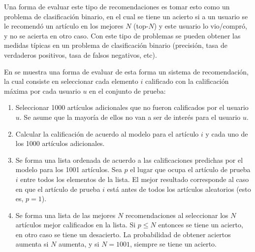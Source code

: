 Una forma de evaluar este tipo de recomendaciones es tomar esto como un problema de clasificación binario, en el cual se tiene un acierto si a un usuario se le recomendó un artículo en los mejores $N$ (top-$N$) y este usuario lo vio/compró, y no se acierta en otro caso. Con este tipo de problemas se pueden obtener las medidas típicas en un problema de clasificación binario (precisión, tasa de verdaderos positivos, tasa de falsos negativos, etc). 

En \cite{Cremonesi:2010:PRA:1864708.1864721} se muestra una forma de evaluar de esta forma un sistema de recomendación, la cual consiste en seleccionar cada elemento $i$ calificado con la calificación máxima por cada usuario $u$ en el conjunto de prueba:

\begin{enumerate}
  \item Seleccionar 1000 artículos adicionales que no fueron calificados por el usuario $u$. Se asume que la mayoría de ellos no van a ser de interés para el usuario $u$.
  \item Calcular la calificación de acuerdo al modelo para el artículo $i$ y cada uno de los 1000 artículos adicionales.
  \item Se forma una lista ordenada de acuerdo a las calificaciones predichas por el modelo para los 1001 artículos. Sea $p$ el lugar que ocupa el artículo de prueba $i$ entre todos los elementos de la lista. El mejor resultado corresponde al caso en que el artículo de prueba $i$ está antes de todos los artículos aleatorios (esto es, $p = 1$).
  \item Se forma una lista de las mejores $N$ recomendaciones al seleccionar los $N$ artículos mejor calificados en la lista. Si $p \leq N$ entonces se tiene un acierto, en otro caso se tiene un desacierto. La probabilidad de obtener aciertos aumenta si $N$ aumenta, y si $N = 1001$, siempre se tiene un acierto.
  
\end{enumerate}










